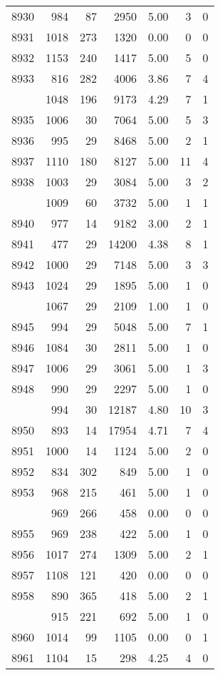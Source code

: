 \documentclass[
]{article}
\begin{document}
\begin{table}
\begin{tabular}[t]{lrrrrrr}
8930 & 984 & 87 & 2950 & 5.00 & 3 & 0\\
8931 & 1018 & 273 & 1320 & 0.00 & 0 & 0\\
8932 & 1153 & 240 & 1417 & 5.00 & 5 & 0\\
8933 & 816 & 282 & 4006 & 3.86 & 7 & 4\\
\addlinespace
8934 & 1048 & 196 & 9173 & 4.29 & 7 & 1\\
8935 & 1006 & 30 & 7064 & 5.00 & 5 & 3\\
8936 & 995 & 29 & 8468 & 5.00 & 2 & 1\\
8937 & 1110 & 180 & 8127 & 5.00 & 11 & 4\\
8938 & 1003 & 29 & 3084 & 5.00 & 3 & 2\\
\addlinespace
8939 & 1009 & 60 & 3732 & 5.00 & 1 & 1\\
8940 & 977 & 14 & 9182 & 3.00 & 2 & 1\\
8941 & 477 & 29 & 14200 & 4.38 & 8 & 1\\
8942 & 1000 & 29 & 7148 & 5.00 & 3 & 3\\
8943 & 1024 & 29 & 1895 & 5.00 & 1 & 0\\
\addlinespace
8944 & 1067 & 29 & 2109 & 1.00 & 1 & 0\\
8945 & 994 & 29 & 5048 & 5.00 & 7 & 1\\
8946 & 1084 & 30 & 2811 & 5.00 & 1 & 0\\
8947 & 1006 & 29 & 3061 & 5.00 & 1 & 3\\
8948 & 990 & 29 & 2297 & 5.00 & 1 & 0\\
\addlinespace
8949 & 994 & 30 & 12187 & 4.80 & 10 & 3\\
8950 & 893 & 14 & 17954 & 4.71 & 7 & 4\\
8951 & 1000 & 14 & 1124 & 5.00 & 2 & 0\\
8952 & 834 & 302 & 849 & 5.00 & 1 & 0\\
8953 & 968 & 215 & 461 & 5.00 & 1 & 0\\
\addlinespace
8954 & 969 & 266 & 458 & 0.00 & 0 & 0\\
8955 & 969 & 238 & 422 & 5.00 & 1 & 0\\
8956 & 1017 & 274 & 1309 & 5.00 & 2 & 1\\
8957 & 1108 & 121 & 420 & 0.00 & 0 & 0\\
8958 & 890 & 365 & 418 & 5.00 & 2 & 1\\
\addlinespace
8959 & 915 & 221 & 692 & 5.00 & 1 & 0\\
8960 & 1014 & 99 & 1105 & 0.00 & 0 & 1\\
8961 & 1104 & 15 & 298 & 4.25 & 4 & 0\\

\end{tabular}
\end{table}
\end{document}
